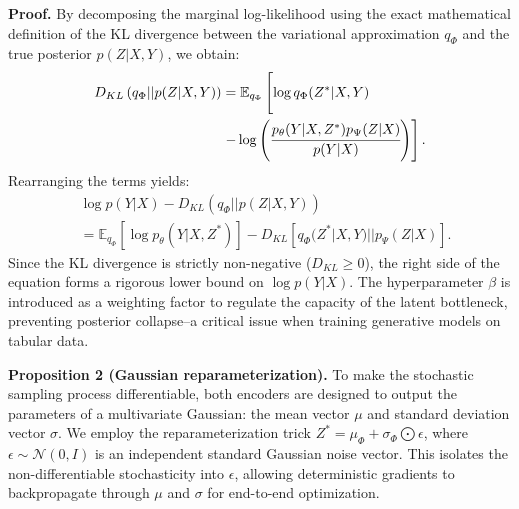 \documentclass[journal]{IEEEtran}
\begin{document}
\textbf{Proof.}
By decomposing the marginal log-likelihood using the exact mathematical definition of the KL divergence between the variational approximation $q_{\Phi}$ and the true posterior $p(Z|X,Y)$, we obtain:
\begin{equation} \begin{split}
    D_{KL}\left(q_{\Phi}||p(Z|X,Y)\right)&=\mathbb{E}_{q_{\Phi}}\left[\log q_{\Phi}(Z^{*}|X,Y) \cfrac{}{}\right.\\
    & \left. - \log\left( \cfrac{p_{\theta}(Y|X,Z^{{*}})p_{\Psi}(Z|X)}{p(Y|X)} \right) \right].
\end{split}\end{equation}
Rearranging the terms yields:
\begin{equation}\begin{split}
    &\log p(Y|X) - D_{KL}\left(q_{\Phi}||p(Z|X,Y)\right) \\
    & = \mathbb{E}_{q_{\Phi}}\left[ \log p_{\theta}(Y|X,Z^{*}) \right] - D_{KL}[q_{\Phi}(Z^{*}|X,Y)||p_{\Psi}(Z|X)].
\end{split}\end{equation}
Since the KL divergence is strictly non-negative ($D_{KL}\ge 0$), the right side of the equation forms a rigorous lower bound on $\log p(Y|X)$.
The hyperparameter $\beta$ is introduced as a weighting factor to regulate the capacity of the latent bottleneck, preventing posterior collapse--a critical issue when training generative models on tabular data.

\textbf{Proposition 2 (Gaussian reparameterization).}
To make the stochastic sampling process differentiable, both encoders are designed to output the parameters of a multivariate Gaussian: the mean vector $\mu$ and standard deviation vector $\sigma$.
We employ the reparameterization trick $Z^{*}=\mu_{\Phi}+\sigma_{\Phi}\bigodot\epsilon$, where $\epsilon\sim\mathcal{N}(0,I)$ is an independent standard Gaussian noise vector.
This isolates the non-differentiable stochasticity into $\epsilon$, allowing deterministic gradients to backpropagate through $\mu$ and $\sigma$ for end-to-end optimization.
\end{document}
